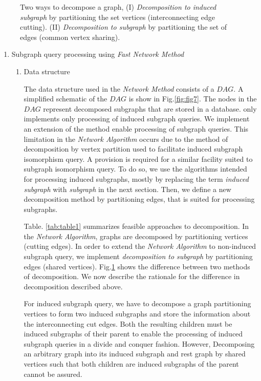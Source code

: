 \begin{figure}
\centering

\caption{Two ways to decompose a graph, (I) \textit{Decomposition to induced subgraph} by partitioning the set vertices (interconnecting edge cutting). (II) \textit{Decomposition to subgraph} by partitioning the set of edges (common vertex sharing).}
\label{fig:fig4}
\end{figure}

\begin{enumerate}
\item  Subgraph query processing using \textit{Fast Network Method}

\begin{enumerate}

\item Data structure

The data structure used in the \textit{Network Method} consists of a $DAG$. A simplified schematic of the $DAG$ is show in Fig.\ref{fig:fig7}. The nodes in the $DAG$ represent decomposed subgraphs that are stored in a database. only implements only processing of induced subgraph queries. We implement an extension of the method enable processing of subgraph queries. This limitation in the \textit{Network Algorithm} occurs due to the method of decomposition by vertex partition used to facilitate induced subgraph isomorphism query. A provision is required for a similar facility suited to subgraph isomorphism query. To do so, we use the algorithms intended for processing induced subgraphs, mostly by replacing the term \textit{induced subgraph} with \textit{subgraph} in the next section. Then, we define a new decomposition method by partitioning edges, that is suited for processing subgraphs.


Table. \ref{tab:table1} summarizes feasible approaches to decomposition. In the \textit{Network Algorithm}, graphs are decomposed by partitioning vertices (cutting edges).
In order to extend the \textit{Network Algorithm} to non-induced subgraph query, we implement \textit{decomposition to subgraph} by partitioning edges (shared vertices). Fig.\ref{fig:fig4} shows the difference between two methods of decomposition. We now describe the rationale for the difference in decomposition described above.

For induced subgraph query, we have to decompose a graph partitioning vertices to form two induced subgraphs and store the information about the interconnecting cut edges. Both the resulting children must be induced subgraphs of their parent to enable the processing of induced subgraph queries in a divide and conquer fashion. However, Decomposing an arbitrary graph into its induced subgraph and rest graph by shared vertices such that both children are induced subgraphs of the parent cannot be assured.


\end{enumerate}
\end{enumerate}
